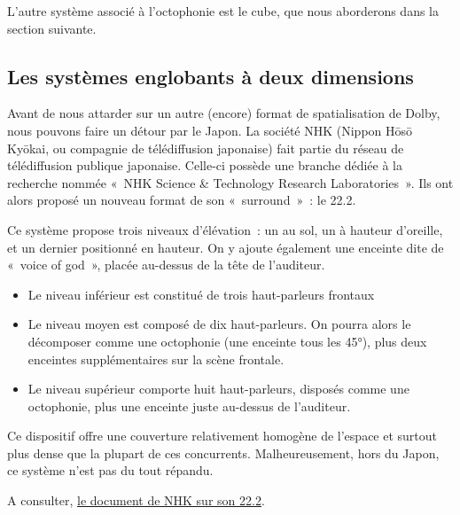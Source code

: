 \documentclass[
  letterpaper,
  DIV=11,
  numbers=noendperiod]{scrreprt}
\providecommand{\tightlist}{%
  \setlength{\itemsep}{0pt}\setlength{\parskip}{0pt}}\usepackage{longtable,booktabs,array}
\begin{document}
L'autre système associé à l'octophonie est le cube, que nous aborderons
dans la section suivante.

\hypertarget{les-systuxe8mes-englobants-uxe0-deux-dimensions}{%
\subsection{Les systèmes englobants à deux
dimensions}\label{les-systuxe8mes-englobants-uxe0-deux-dimensions}}

Avant de nous attarder sur un autre (encore) format de spatialisation de
Dolby, nous pouvons faire un détour par le Japon. La société NHK (Nippon
Hōsō Kyōkai, ou compagnie de télédiffusion japonaise) fait partie du
réseau de télédiffusion publique japonaise. Celle-ci possède une branche
dédiée à la recherche nommée «~NHK Science \& Technology Research
Laboratories~». Ils ont alors proposé un nouveau format de son
«~surround~»~: le 22.2.

Ce système propose trois niveaux d'élévation~: un au sol, un à hauteur
d'oreille, et un dernier positionné en hauteur. On y ajoute également
une enceinte dite de «~voice of god~», placée au-dessus de la tête de
l'auditeur.

\begin{itemize}
\tightlist
\item
  Le niveau inférieur est constitué de trois haut-parleurs frontaux
\item
  Le niveau moyen est composé de dix haut-parleurs. On pourra alors le
  décomposer comme une octophonie (une enceinte tous les 45°), plus deux
  enceintes supplémentaires sur la scène frontale.
\item
  Le niveau supérieur comporte huit haut-parleurs, disposés comme une
  octophonie, plus une enceinte juste au-dessus de l'auditeur.
\end{itemize}

Ce dispositif offre une couverture relativement homogène de l'espace et
surtout plus dense que la plupart de ces concurrents. Malheureusement,
hors du Japon, ce système n'est pas du tout répandu.

\begin{tcolorbox}[enhanced jigsaw, leftrule=.75mm, arc=.35mm, bottomtitle=1mm, colback=white, colbacktitle=quarto-callout-note-color!10!white, opacityback=0, left=2mm, rightrule=.15mm, opacitybacktitle=0.6, breakable, toptitle=1mm, titlerule=0mm, bottomrule=.15mm, toprule=.15mm, coltitle=black, title=\textcolor{quarto-callout-note-color}{\faInfo}\hspace{0.5em}{Note}]

A consulter,
\href{https://www.nhk.or.jp/strl/publica/bt/en/fe0045-6.pdf}{le document
de NHK sur son 22.2}.

\end{tcolorbox}
\end{document}
